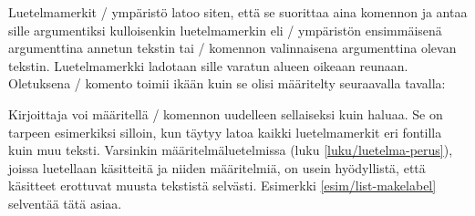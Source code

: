 Luetelmamerkit \-/ ympäristö latoo siten, että se
suorittaa aina komennon  ja antaa sille argumentiksi
kulloisenkin luetelmamerkin eli \-/ ympäristön
ensimmäisenä argumenttina annetun tekstin tai \-/ komennon
valinnaisena argumenttina olevan tekstin. Luetelmamerkki ladotaan sille
varatun alueen oikeaan reunaan. Oletuksena \-/
komento toimii ikään kuin se olisi määritelty seuraavalla tavalla:

\begin{koodilohkosis}
\renewcommand{\makelabel}[1]{\hfill #1}
\end{koodilohkosis}

\noindent
Kirjoittaja voi määritellä \-/ komennon uudelleen
sellaiseksi kuin haluaa. Se on tarpeen esimerkiksi silloin, kun täytyy
latoa kaikki luetelmamerkit eri fontilla kuin muu teksti. Varsinkin
määritelmäluetelmissa (luku \ref{luku/luetelma-perus}), joissa
luetellaan käsitteitä ja niiden määritelmiä, on usein hyödyllistä, että
käsitteet erottuvat muusta tekstistä selvästi. Esimerkki
\ref{esim/list-makelabel} selventää tätä asiaa.

